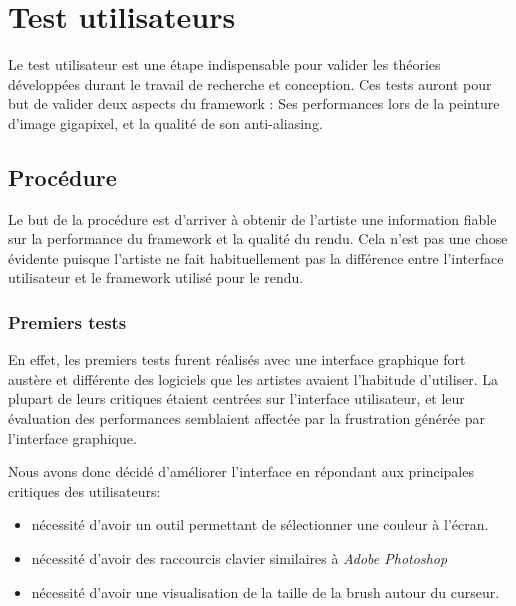 \chapter{Test utilisateurs}
	Le test utilisateur est une étape indispensable pour valider les
	théories développées durant le travail de recherche et conception.
	Ces tests auront pour but de valider deux aspects du framework : Ses
	performances lors de la peinture d'image gigapixel, et la qualité
	de son anti-aliasing. 

	\section{Procédure}
		Le but de la procédure est d'arriver à obtenir de l'artiste une
		information fiable sur la performance du framework et la qualité du rendu. 
		Cela n'est pas une chose évidente puisque l'artiste ne fait habituellement
		pas la différence entre l'interface utilisateur et le framework utilisé pour
		le rendu. 

		\subsection{Premiers tests}
		En effet, les premiers tests furent réalisés avec une interface graphique fort
		austère et différente des logiciels que les artistes avaient l'habitude d'utiliser.
		La plupart de leurs critiques étaient centrées sur l'interface utilisateur, et
		leur évaluation des performances semblaient affectée par la frustration générée
		par l'interface graphique.

		Nous avons donc décidé d'améliorer l'interface en répondant aux principales critiques
		des utilisateurs:
		\begin{itemize}
			\item nécessité d'avoir un outil permettant de sélectionner une couleur à l'écran.
			\item nécessité d'avoir des raccourcis clavier similaires à \emph{Adobe Photoshop}
			\item nécessité d'avoir une visualisation de la taille de la brush autour du curseur.
		\end{itemize}


